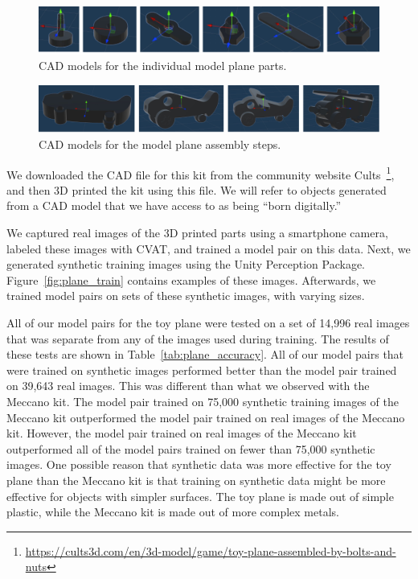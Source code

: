 \begin{figure}
  \includegraphics[width=\columnwidth]{figures/synthetic/plane_parts.pdf}
  \caption{
    CAD models for the individual model plane parts.
  }\label{fig:plane_parts}
\end{figure}

\begin{figure}
  \includegraphics[width=\columnwidth]{figures/synthetic/plane_steps.pdf}
  \caption{
    CAD models for the model plane assembly steps.
  }\label{fig:plane_steps}
\end{figure}

We downloaded the CAD file for this kit from the community website
Cults~\footnote{\url{https://cults3d.com/en/3d-model/game/toy-plane-assembled-by-bolts-and-nuts}},
and then 3D printed the kit using this file.
We will refer to objects generated from a CAD model that we have access to as
being ``born digitally.''

We captured real images of the 3D printed parts using a smartphone camera,
labeled these images with CVAT, and trained a model pair on this data.
Next, we generated synthetic training images using the Unity Perception Package.
Figure~\ref{fig:plane_train} contains examples of these images.
Afterwards, we trained model pairs on sets of these synthetic images, with
varying sizes.

All of our model pairs for the toy plane were tested on a set of 14,996 real
images that was separate from any of the images used during training.
The results of these tests are shown in Table~\ref{tab:plane_accuracy}.
All of our model pairs that were trained on synthetic images performed better
than the model pair trained on 39,643 real images.
This was different than what we observed with the Meccano kit.
The model pair trained on 75,000 synthetic training images of the Meccano
kit outperformed the model pair trained on real images of the Meccano kit.
However, the model pair trained on real images of the Meccano kit outperformed
all of the model pairs trained on fewer than 75,000 synthetic images.
One possible reason that synthetic data was more effective for the toy plane
than the Meccano kit is that training on synthetic data might be more effective
for objects with simpler surfaces.
The toy plane is made out of simple plastic, while the Meccano kit is made out
of more complex metals.

